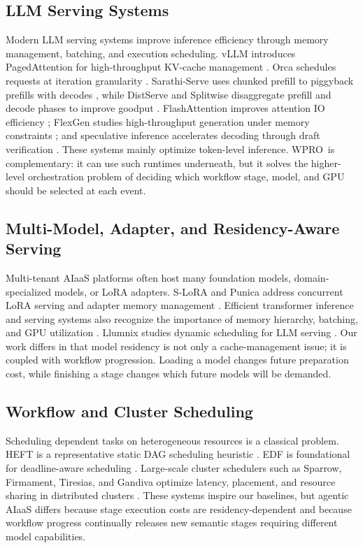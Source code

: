\documentclass[10pt,conference]{IEEEtran}
\newcommand{\WPRO}{\textsc{WPRO}}
\begin{document}
\subsection{LLM Serving Systems}

Modern LLM serving systems improve inference efficiency through memory management, batching, and execution scheduling. vLLM introduces PagedAttention for high-throughput KV-cache management \cite{kwon2023vllm}. Orca schedules requests at iteration granularity \cite{yu2022orca}. Sarathi-Serve uses chunked prefill to piggyback prefills with decodes \cite{agrawal2024sarathi}, while DistServe and Splitwise disaggregate prefill and decode phases to improve goodput \cite{zhong2024distserve,patel2024splitwise}. FlashAttention improves attention IO efficiency \cite{dao2022flashattention}; FlexGen studies high-throughput generation under memory constraints \cite{sheng2023flexgen}; and speculative inference accelerates decoding through draft verification \cite{miao2023specinfer}. These systems mainly optimize token-level inference. \WPRO\ is complementary: it can use such runtimes underneath, but it solves the higher-level orchestration problem of deciding which workflow stage, model, and GPU should be selected at each event.

\subsection{Multi-Model, Adapter, and Residency-Aware Serving}

Multi-tenant AIaaS platforms often host many foundation models, domain-specialized models, or LoRA adapters. S-LoRA and Punica address concurrent LoRA serving and adapter memory management \cite{sheng2023slora,chen2023punica}. Efficient transformer inference and serving systems also recognize the importance of memory hierarchy, batching, and GPU utilization \cite{pope2023efficiently,aminabadi2022deepspeed}. Llumnix studies dynamic scheduling for LLM serving \cite{sun2024llumnix}. Our work differs in that model residency is not only a cache-management issue; it is coupled with workflow progression. Loading a model changes future preparation cost, while finishing a stage changes which future models will be demanded.

\subsection{Workflow and Cluster Scheduling}

Scheduling dependent tasks on heterogeneous resources is a classical problem. HEFT is a representative static DAG scheduling heuristic \cite{topcuoglu2002heft}. EDF is foundational for deadline-aware scheduling \cite{liu1973scheduling}. Large-scale cluster schedulers such as Sparrow, Firmament, Tiresias, and Gandiva optimize latency, placement, and resource sharing in distributed clusters \cite{ousterhout2013sparrow,gog2016firmament,gu2019tiresias,xiao2018gandiva}. These systems inspire our baselines, but agentic AIaaS differs because stage execution costs are residency-dependent and because workflow progress continually releases new semantic stages requiring different model capabilities.
\end{document}
